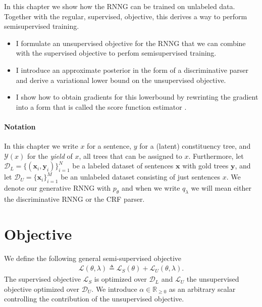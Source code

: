 

In this chapter we show how the RNNG can be trained on unlabeled data. Together with the regular, supervised, objective, this derives a way to perform semisupervised training.
\begin{itemize}
  \item I formulate an unsupervised objective for the RNNG that we can combine with the supervised objective to perfom semisupervised training.
  \item I introduce an approximate posterior in the form of a discriminative parser and derive a variational lower bound on the unsupervised objective.
  \item I show how to obtain gradients for this lowerbound by rewrinting the gradient into a form that is called the score function estimator \citep{Williams1992:REINFORCE,Fu2006}.
\end{itemize}

\paragraph{Notation} In this chapter we write $x$ for a sentence, $y$ for a (latent) constituency tree, and $\mathcal{Y}(x)$ for the \textit{yield} of $x$, all trees that can be assigned to $x$. Furthermore, let $\mathcal{D}_L = \{ (\mathbf{x}_i, \mathbf{y}_i)\}_{i=1}^N$ be a labeled dataset of sentences $\mathbf{x}$ with gold trees $\mathbf{y}$, and let $\mathcal{D}_U = \{ \mathbf{x}_i \}_{i=1}^M$ be an unlabeled dataset consisting of just sentences $x$. We denote our generative RNNG with $p_{\theta}$ and when we write $q_{\lambda}$ we will mean either the discriminative RNNG or the CRF parser.

\section{Objective}
We define the following general semi-supervised objective
\begin{align*}
  \mathcal{L}(\theta, \lambda) \triangleq \mathcal{L}_{S}(\theta) + \mathcal{L}_{U}(\theta, \lambda).
\end{align*}
The supervised objective $\mathcal{L}_{S}$ is optimized over $\mathcal{D}_L$ and $\mathcal{L}_{U}$ the unsupervised objective optimized over $\mathcal{D}_U$. We introduce $\alpha \in \mathbb{R}_{\geq 0}$ as an arbitrary scalar controlling the contribution of the unsupervised objective.

